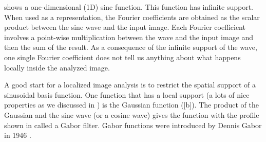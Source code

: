 


 shows a one-dimensional (1D) sine function. This function has infinite support. When used as a representation, the Fourier coefficients are obtained as the scalar product between the sine wave and the input image. Each Fourier coefficient involves a point-wise multiplication between the wave and the input image and then the sum of the result. As a consequence of the infinite support of the wave, one single Fourier coefficient does not tell us anything about what happens locally inside the analyzed image. 

A good start for a localized image analysis is to restrict the spatial support of a sinusoidal basis function. One function that has a local support (a lots of nice properties as we discussed in \chap{\ref{chap:blur_filters}}) is the Gaussian function (\fig{\ref{fig:1D_gabor_function}}[b]). The product of the Gaussian and the sine wave (or a cosine wave) gives the function with the profile shown in  called a Gabor filter. Gabor functions were introduced by Dennis Gabor in 1946 \cite{Gabor1946TheoryOC}.


